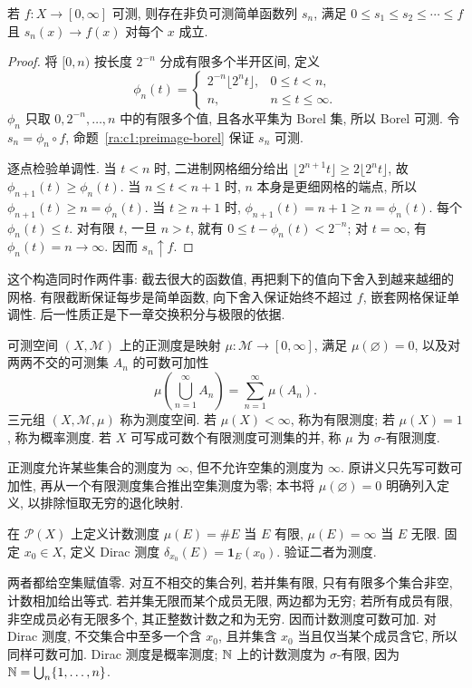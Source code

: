 \begin{theorem}\label{ra:c1:simple-approx}
若 $f:X\to[0,\infty]$ 可测, 则存在非负可测简单函数列 $s_n$, 满足 $0\le s_1\le s_2\le\cdots\le f$ 且 $s_n(x)\to f(x)$ 对每个 $x$ 成立.
\end{theorem}
\begin{proof}
将 $[0,n)$ 按长度 $2^{-n}$ 分成有限多个半开区间, 定义
\[
 \phi_n(t)=
 \begin{cases}
  2^{-n}\lfloor2^nt\rfloor,&0\le t<n,\\
  n,&n\le t\le\infty.
 \end{cases}
\]
$\phi_n$ 只取 $0,2^{-n},\ldots,n$ 中的有限多个值, 且各水平集为 Borel 集, 所以 Borel 可测. 令 $s_n=\phi_n\circ f$, 命题~\ref{ra:c1:preimage-borel} 保证 $s_n$ 可测.

逐点检验单调性. 当 $t<n$ 时, 二进制网格细分给出 $\lfloor2^{n+1}t\rfloor\ge2\lfloor2^nt\rfloor$, 故 $\phi_{n+1}(t)\ge\phi_n(t)$. 当 $n\le t<n+1$ 时, $n$ 本身是更细网格的端点, 所以 $\phi_{n+1}(t)\ge n=\phi_n(t)$. 当 $t\ge n+1$ 时, $\phi_{n+1}(t)=n+1\ge n=\phi_n(t)$. 每个 $\phi_n(t)\le t$. 对有限 $t$, 一旦 $n>t$, 就有 $0\le t-\phi_n(t)<2^{-n}$; 对 $t=\infty$, 有 $\phi_n(t)=n\to\infty$. 因而 $s_n\uparrow f$.
\end{proof}
这个构造同时作两件事: 截去很大的函数值, 再把剩下的值向下舍入到越来越细的网格. 有限截断保证每步是简单函数, 向下舍入保证始终不超过 $f$, 嵌套网格保证单调性. 后一性质正是下一章交换积分与极限的依据.

\begin{definition}\label{ra:c1:measure}
可测空间 $(X,\mathcal M)$ 上的正测度是映射 $\mu:\mathcal M\to[0,\infty]$, 满足 $\mu(\varnothing)=0$, 以及对两两不交的可测集 $A_n$ 的可数可加性
\[
 \mu\left(\bigcup_{n=1}^{\infty}A_n\right)=\sum_{n=1}^{\infty}\mu(A_n).
\]
三元组 $(X,\mathcal M,\mu)$ 称为测度空间. 若 $\mu(X)<\infty$, 称为有限测度; 若 $\mu(X)=1$, 称为概率测度. 若 $X$ 可写成可数个有限测度可测集的并, 称 $\mu$ 为 $\sigma$-有限测度.
\end{definition}
正测度允许某些集合的测度为 $\infty$, 但不允许空集的测度为 $\infty$. 原讲义只先写可数可加性, 再从一个有限测度集合推出空集测度为零; 本书将 $\mu(\varnothing)=0$ 明确列入定义, 以排除恒取无穷的退化映射.

\begin{example}
在 $\mathcal P(X)$ 上定义计数测度 $\mu(E)=\#E$ 当 $E$ 有限, $\mu(E)=\infty$ 当 $E$ 无限. 固定 $x_0\in X$, 定义 Dirac 测度 $\delta_{x_0}(E)=\mathbf1_E(x_0)$. 验证二者为测度.
\end{example}
\begin{solution}
两者都给空集赋值零. 对互不相交的集合列, 若并集有限, 只有有限多个集合非空, 计数相加给出等式. 若并集无限而某个成员无限, 两边都为无穷; 若所有成员有限, 非空成员必有无限多个, 其正整数计数之和为无穷. 因而计数测度可数可加. 对 Dirac 测度, 不交集合中至多一个含 $x_0$, 且并集含 $x_0$ 当且仅当某个成员含它, 所以同样可数可加. Dirac 测度是概率测度; $\mathbb N$ 上的计数测度为 $\sigma$-有限, 因为 $\mathbb N=\bigcup_n\{1,\ldots,n\}$.
\end{solution}

